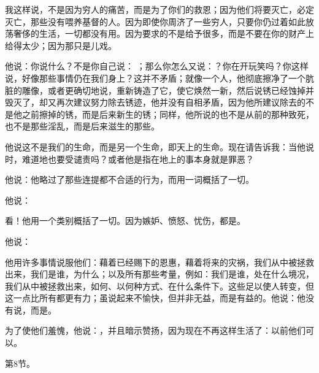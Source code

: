 我这样说，不是因为穷人的痛苦，而是为了你们的救恩；因为他们将要灭亡，必定灭亡，那些没有喂养基督的人。因为即使你周济了一些穷人，只要你仍过着如此放荡奢侈的生活，一切都没有用。因为要求的不是给予很多，而是不要在你的财产上给得太少；因为那只是儿戏。\par

他说：你说什么？不是你自己说： ；那么你怎么又说：？你在开玩笑吗？你这样说，好像那些事情仍在我们身上？这并不矛盾；就像一个人，他彻底擦净了一个肮脏的雕像，或者更确切地说，重新铸造了它，使它焕然一新，然后说锈已经蚀掉并毁灭了，却又再次建议努力除去锈迹，他并没有自相矛盾，因为他所建议除去的不是他之前擦掉的锈，而是后来新生的锈；同样，他所说的也不是从前的那种致死，也不是那些淫乱，而是后来滋生的那些。\par

他说这不是我们的生命，而是另一个生命，即天上的生命。现在请告诉我：当他说时，难道地也要受谴责吗？或者他是指在地上的事本身就是罪恶？\par

他说：他略过了那些连提都不合适的行为，而用一词概括了一切。\par

他说：\par

看！他用一个类别概括了一切。因为嫉妒、愤怒、忧伤，都是。\par

他说：\par

他用许多事情说服他们：藉着已经赐下的恩惠，藉着将来的灾祸，我们从中被拯救出来，我们是谁，为什么；以及所有那些考量，例如：我们是谁，处在什么境况，我们从中被拯救出来，如何、以何种方式、在什么条件下。这些足以使人转变，但这一点比所有都更有力；虽说起来不愉快，但并非无益，而是有益的。他说：他没有说，而是。\par

为了使他们羞愧，他说：，并且暗示赞扬，因为现在不再这样生活了：以前他们可以。\par

第8节。 \par

